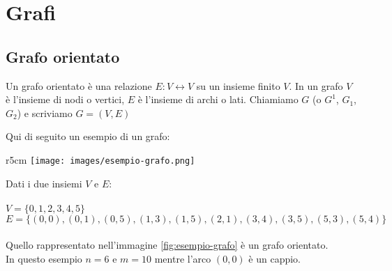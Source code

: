 \newpage
\section{Grafi}
\subsection{Grafo orientato}
\begin{definition}
Un grafo orientato è una relazione $E: V \leftrightarrow V$ su un insieme finito $V$. In un grafo $V$ è l'insieme di nodi o vertici, $E$ è l'insieme di archi o lati. Chiamiamo $G$ (o $G^1$, $G_1$, $G_2$) e scriviamo $G = (V,E)$
\end{definition}

\begin{example}\label{esempio-grafo-1}
    Qui di seguito un esempio di un grafo:
\end{example}
\begin{wrapfigure}[4]{r}{5cm}
    \vspace{-35pt}
    \centering
    \texttt{[image: images/esempio-grafo.png]}
    \vspace{-5pt}
    \caption{Grafo G}
    \label{fig:esempio-grafo}
\end{wrapfigure}

\hspace{-15pt}Dati i due insiemi $V$ e $E$:\\\\
$V = \{0,1,2,3,4,5\}$ \\
$E = \{(0,0), (0,1), (0,5), (1,3), (1,5), (2,1), (3,4), (3,5), (5,3), (5,4)\}$\\ \\
Quello rappresentato nell'immagine \ref{fig:esempio-grafo} è un grafo orientato.\\
In questo esempio $n = 6$ e $m = 10$ mentre l'arco $(0,0)$ è un cappio.

